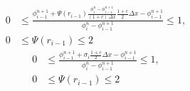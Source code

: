 \documentclass[../thesis.tex]{subfiles}
\begin{document}
\begin{equation}
    \begin{split}
        0
        &\leq
        \frac{\phi_{i-1}^{n+1}
        + \Psi(r_{i-1})
        \frac{\phi_{i}^{n} - \phi_{i-1}^{n+1}}
        {(1+c)~\Delta x}\frac{1+c}{2}\Delta x
        - \phi_{i-1}^{n+1}}
        {\phi_{i}^{n} - \phi_{i-1}^{n+1}}
        \leq
        1,
        \\
        0
        &\leq
        \Psi(r_{i-1})
        \leq
        2
    \end{split}
\end{equation}
\begin{equation}
    \begin{split}
        0
        &\leq
        \frac{\phi_{i-1}^{n+1}
        + \sigma_{i}\frac{1+c}{2}\Delta x
        - \phi_{i-1}^{n+1}}
        {\phi_{i}^{n} - \phi_{i-1}^{n+1}}
        \leq
        1,
        \\
        0
        &\leq
        \Psi(r_{i-1})
        \leq
        2
    \end{split}
\end{equation}
\end{document}
